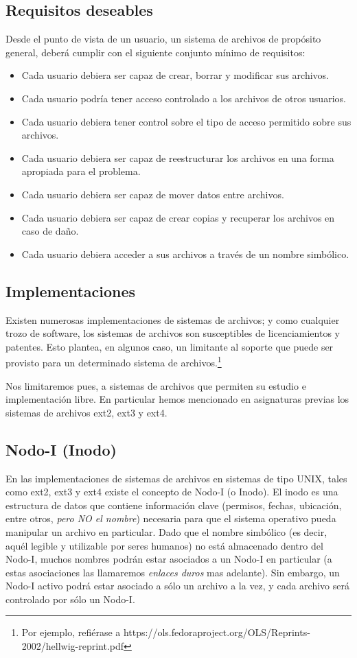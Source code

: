 \documentclass[12pt]{article}
\begin{document}
\subsection*{Requisitos deseables}
Desde el punto de vista de un usuario, un sistema de archivos de propósito 
general, deberá cumplir con el siguiente conjunto mínimo de requisitos:

\begin{itemize}
\item Cada usuario debiera ser capaz de crear, borrar y modificar sus 
archivos.
\item Cada usuario podría tener acceso controlado a los archivos de otros 
usuarios.
\item Cada usuario debiera tener control sobre el tipo de acceso permitido
sobre sus archivos. 
\item Cada usuario debiera ser capaz de reestructurar los archivos en una 
forma apropiada para el problema.
\item Cada usuario debiera ser capaz de mover datos entre archivos. 
\item Cada usuario debiera ser capaz de crear copias y recuperar los 
archivos en caso de daño. 
\item Cada usuario debiera acceder a sus archivos a través de un nombre
simbólico.
\end{itemize}

\subsection*{Implementaciones}
Existen numerosas implementaciones de sistemas de archivos; y como cualquier 
trozo de software, los sistemas de archivos son susceptibles de licenciamientos 
y patentes. Esto plantea, en algunos caso, un limitante al soporte que puede ser
provisto para un determinado sistema de archivos.\footnote{Por ejemplo, refiérase a https://ols.fedoraproject.org/OLS/Reprints-2002/hellwig-reprint.pdf}

Nos limitaremos pues, a sistemas de archivos que permiten su estudio e 
implementación libre. En particular hemos mencionado en asignaturas previas
los sistemas de archivos ext2, ext3 y ext4. 

\subsection*{Nodo-I (Inodo)}
En las implementaciones de sistemas de archivos en sistemas de tipo UNIX, tales
como ext2, ext3 y ext4 existe el concepto de Nodo-I (o Inodo). El inodo es una
estructura de datos que contiene información clave (permisos, fechas, ubicación, entre otros, \textit{pero NO el nombre}) necesaria para que el sistema 
operativo pueda manipular un archivo en particular. Dado que el nombre 
simbólico (es decir, aquél legible y utilizable por seres humanos) no está 
almacenado dentro del Nodo-I, muchos nombres podrán estar asociados a un 
Nodo-I en particular (a estas asociaciones las llamaremos \textit{enlaces 
duros} mas adelante). Sin embargo, un Nodo-I activo podrá estar asociado a sólo
un archivo a la vez, y cada archivo será controlado por sólo un Nodo-I. 
\end{document}
